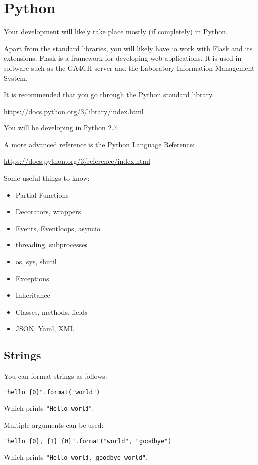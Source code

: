\documentclass{article}
\begin{document}
\newpage

\section{Python}

Your development will likely take place mostly (if completely) in Python.

Apart from the standard libraries, you will likely have to work 
with Flask and its extensions.
Flask is a framework for developing web applications.
It is used in software such as the GA4GH server and the 
Laboratory Information Management System.

It is recommended that you go through the Python standard library.

\url{https://docs.python.org/3/library/index.html}

You will be developing in Python 2.7. 

A more advanced reference is the Python Language Reference:

\url{https://docs.python.org/3/reference/index.html}

Some useful things to know:

\begin{itemize}
\item Partial Functions
\item Decorators, wrappers
\item Events, Eventloops, asyncio
\item threading, subprocesses
\item os, sys, shutil
\item Exceptions
\item Inheritance
\item Classes, methods, fields
\item JSON, Yaml, XML
\end{itemize}

\subsection{Strings}

You can format strings as follows:
\begin{verbatim}
"hello {0}".format("world")
\end{verbatim}
Which prints \texttt{"Hello world"}.

Multiple arguments can be used:
\begin{verbatim}
"hello {0}, {1} {0}".format("world", "goodbye")
\end{verbatim}
Which prints \texttt{"Hello world, goodbye world"}.
\end{document}
